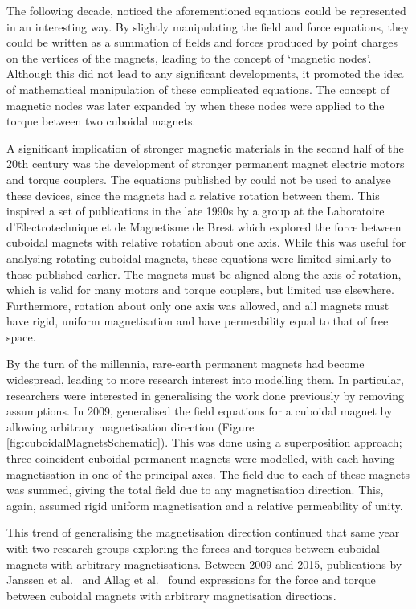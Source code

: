 The following decade, \textcite{Bancel1999} noticed the aforementioned equations could be represented in an interesting way. By slightly manipulating the field and force equations, they could be written as a summation of fields and forces produced by point charges on the vertices of the magnets, leading to the concept of `magnetic nodes'. Although this did not lead to any significant developments, it promoted the idea of mathematical manipulation of these complicated equations. The concept of magnetic nodes was later expanded by \textcite{Yonnet2011} when these nodes were applied to the torque between two cuboidal magnets.

A significant implication of stronger magnetic materials in the second half of the 20th century was the development of stronger permanent magnet electric motors and torque couplers. The equations published by \textcite{Akoun1984} could not be used to analyse these devices, since the magnets had a relative rotation between them. This inspired a set of publications in the late 1990s by a group at the Laboratoire d'Electrotechnique et de Magnetisme de Brest \cite{Charpentier1999,Charpentier1999a,Elies1998,Elies1999} which explored the force between cuboidal magnets with relative rotation about one axis. While this was useful for analysing rotating cuboidal magnets, these equations were limited similarly to those published earlier. The magnets must be aligned along the axis of rotation, which is valid for many motors and torque couplers, but limited use elsewhere. Furthermore, rotation about only one axis was allowed, and all magnets must have rigid, uniform magnetisation and have permeability equal to that of free space.

By the turn of the millennia, rare-earth permanent magnets had become widespread, leading to more research interest into modelling them. In particular, researchers were interested in generalising the work done previously by removing assumptions. In 2009, \textcite{Ravaud2009} generalised the field equations for a cuboidal magnet by allowing arbitrary magnetisation direction (Figure \ref{fig:cuboidalMagnetsSchematic}). This was done using a superposition approach; three coincident cuboidal permanent magnets were modelled, with each having magnetisation in one of the principal axes. The field due to each of these magnets was summed, giving the total field due to any magnetisation direction. This, again, assumed rigid uniform magnetisation and a relative permeability of unity.

This trend of generalising the magnetisation direction continued that same year with two research groups exploring the forces and torques between cuboidal magnets with arbitrary magnetisations. Between 2009 and 2015, publications by Janssen et al.\ \cite{Janssen2009a,Janssen2010,Janssen2011} and Allag et al.\ \cite{Allag2009,Allag2009a,Allag2009b,Allag2015} found expressions for the force and torque between cuboidal magnets with arbitrary magnetisation directions.

